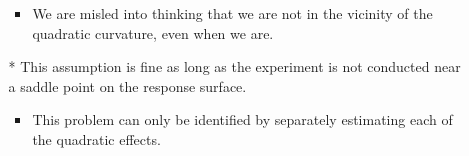 \begin{itemize}
\begin{itemize}
\begin{itemize}[$\hookrightarrow$]
                              \item We are misled into thinking that we are not in the vicinity of the quadratic curvature, even when we are.
                        \end{itemize}
                  \item[*] This assumption is fine as long as the experiment is not conducted near a saddle point on the
                        response surface.
                        \begin{itemize}[$\hookrightarrow$]
                              \item This problem can only be identified by separately estimating each of the quadratic effects.
                        \end{itemize}
            \end{itemize}
\end{itemize}
